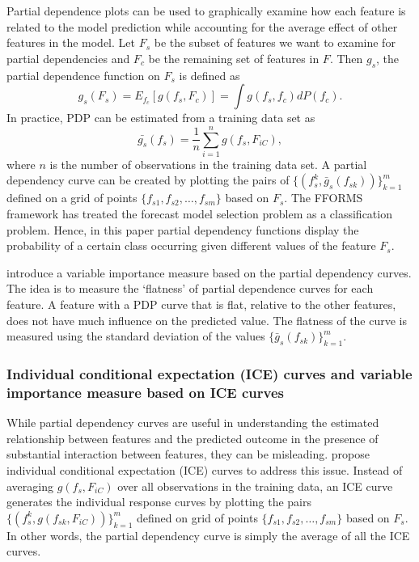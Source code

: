 \documentclass[11pt,a4paper,]{article}
\begin{document}
Partial dependence plots can be used to graphically examine how each feature is related to the model prediction while accounting for the average effect of other features in the model. Let \(F_s\) be the subset of features we want to examine for partial dependencies and \(F_c\) be the remaining set of features in \(F\). Then \(g_s\), the partial dependence function on \(F_s\) is defined as
\[g_s(F_s)=E_{f_c}[g(f_s, F_c)]=\int{g(f_s, f_c)dP(f_c).}\]
In practice, PDP can be estimated from a training data set as
\[\bar{g_s}(f_s)=\frac{1}{n}\sum_{i=1}^{n}g(f_s, F_{iC}),\]
where \(n\) is the number of observations in the training data set. A partial dependency curve can be created by plotting the pairs of \(\{(f_s^k, \bar{g}_s(f_{sk}))\}_{k=1}^{m}\) defined on a grid of points \(\{f_{s1}, f_{s2},\dots, f_{sm}\}\) based on \(F_s\). The FFORMS framework has treated the forecast model selection problem as a classification problem. Hence, in this paper partial dependency functions display the probability of a certain class occurring given different values of the feature \(F_s\).

\textcite{Greenwell2018} introduce a variable importance measure based on the partial dependency curves. The idea is to measure the `flatness' of partial dependence curves for each feature. A feature with a PDP curve that is flat, relative to the other features, does not have much influence on the predicted value. The flatness of the curve is measured using the standard deviation of the values \(\{\bar{g}_{s}(f_{sk})\}_{k=1}^{m}\).

\hypertarget{individual-conditional-expectation-ice-curves-and-variable-importance-measure-based-on-ice-curves}{%
\subsubsection{Individual conditional expectation (ICE) curves and variable importance measure based on ICE curves}\label{individual-conditional-expectation-ice-curves-and-variable-importance-measure-based-on-ice-curves}}

While partial dependency curves are useful in understanding the estimated relationship between features and the predicted outcome in the presence of substantial interaction between features, they can be misleading. \textcite{goldstein2015peeking} propose individual conditional expectation (ICE) curves to address this issue. Instead of
averaging \(g(f_s, F_{iC})\) over all observations in the training data, an ICE curve generates the individual response curves by plotting the pairs \(\{(f_s^k, g(f_{sk}, F_{iC}))\}_{k=1}^{m}\) defined on grid of points \(\{f_{s1}, f_{s2},\dots, f_{sm}\}\) based on \(F_s\). In other words, the partial dependency curve is simply the average of all the ICE curves.
\end{document}
